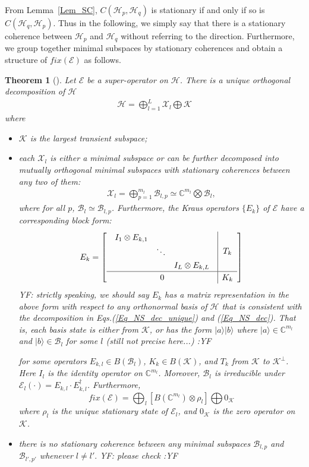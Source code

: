 \documentclass[journal]{IEEEtran}
\def\>{\ensuremath{\rangle}}
\def\h{\ensuremath{\mathcal{H}}}
\def\k{\ensuremath{\mathcal{K}}}
\def\x{\ensuremath{\mathcal{X}}}
\def\b{\ensuremath{\mathcal{B}}}
\def\e{\ensuremath{\mathcal{E}}}
\def\>{\rangle}
\def\k{\mathcal{K}}
\newtheorem{theorem}{Theorem}
\newcommand{\authorComment}[3]{\color{#1}#2: {#3} :#2\color{black}}
\newcommand{\yf}[1]{\authorComment{blue}{YF}{#1}}
\begin{document}
 From Lemma~\ref{Lem_SC}, $C(\h_p,\h_q)$ is stationary if and only if so is $C(\h_q,\h_p)$. Thus in the following, we simply say that there is a stationary coherence between $\h_p$ and $\h_q$ without referring to the direction.
Furthermore,  we group together minimal subspaces by stationary coherences and obtain a structure of $fix(\e)$ as follows. 
\begin{theorem}[\cite{baumgartner2012structure}]\label{Theo_NS_Dec}
  Let $\e$ be a super-operator on $\h$. There is a unique  orthogonal decomposition of $\h$
  \begin{eqnarray}\label{Eq_NS_dec_unique}
    \h=\bigoplus_{l=1}^{L}\x_l\bigoplus \k
  \end{eqnarray}
  where \begin{itemize}
    \item[(1)] $\k$ is the largest transient subspace;
    \item[(2)] each $\x_l$ is either a minimal subspace or can be further decomposed into mutually orthogonal minimal subspaces with stationary coherences between any two of them:
    \begin{eqnarray}\label{Eq_NS_dec}
      \x_l=\bigoplus_{p=1}^{m_l}\b_{l,p}\simeq\mathbb{C}^{m_l}\bigotimes \b_l, 
    \end{eqnarray} 
   where for all $p$, $\b_l\simeq \b_{l,p}$. Furthermore, the Kraus operators $\{E_k\}$ of $\e$ have a corresponding block form:
  \begin{eqnarray}\label{Eq_SC_dec_Kraus}
    \renewcommand{\arraystretch}{1.2}
E_k=\left[\begin{array}{c|c}
  \begin{array}{ccc}
  I_{1}\otimes E_{k,1} &  &\\
   & \ddots &\\
   & & I_{L}\otimes E_{k,L}  
  \end{array} & T_k\\
  \hline
0&K_k
\end{array}\right]
  \end{eqnarray}
\yf{strictly speaking, we should say $E_k$ has a matrix representation in the above form with respect to any orthonormal basis of $\h$ that is consistent with the decomposition in Eqs.(\ref{Eq_NS_dec_unique}) and (\ref{Eq_NS_dec}). That is, each basis state is either from $\k$, or has the form $|a\>|b\>$ where $|a\>\in \mathbb{C}^{m_l}$ and $|b\>\in \b_l$ for some $l$ (still not precise here...)}

for some operators $E_{k,l}\in B(\b_l)$, $K_k\in B(\k)$, and $T_k$ from $\k$ to $\k^\perp$. Here  $I_{l}$ is the identity operator on $\mathbb{C}^{m_l}$. Moreover, $\b_l$ is irreducible under $\e_{l}(\cdot)=E_{k,l}\cdot E_{k,l}^\dagger$. Furthermore, 
$$fix(\e)=\bigoplus_{l}[B(\mathbb{C}^{m_l})\otimes \rho_{l}]\bigoplus 0_\k $$
    where $\rho_l$ is the unique stationary state of $\e_{l}$, and $0_\k$ is the zero operator on $\k$.
    \item[(3)] there is no stationary coherence between any minimal subspaces $\b_{l, p}$ and $\b_{l', p'}$ whenever $l\neq l'.$  \yf{please check}
      \end{itemize}
\end{theorem}
\end{document}
